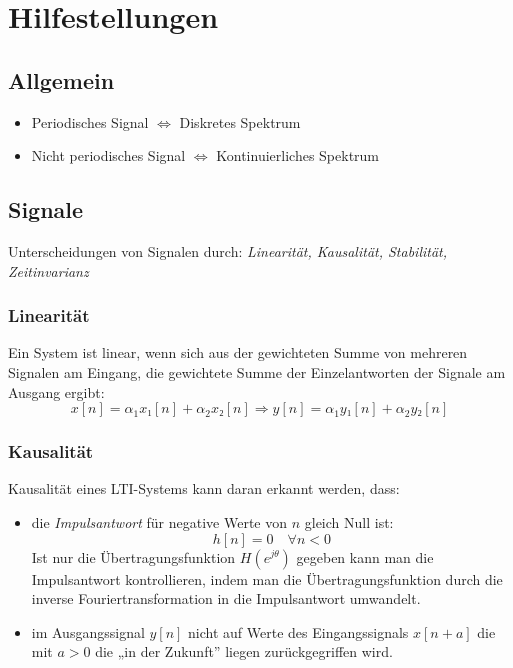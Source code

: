 \documentclass[a4paper, 12pt]{article}
\begin{document}
\section{Hilfestellungen}

\subsection{Allgemein}

\begin{itemize}
    \item Periodisches Signal $⇔$ Diskretes Spektrum
    \item Nicht periodisches Signal $⇔$ Kontinuierliches Spektrum
\end{itemize}

\subsection{Signale}

Unterscheidungen von Signalen durch: \textit{Linearität, Kausalität, Stabilität, Zeitinvarianz}

\subsubsection{Linearität}
Ein System ist linear, wenn sich aus der gewichteten Summe von mehreren Signalen am Eingang, die gewichtete Summe der Einzelantworten der Signale am Ausgang ergibt:
\[
    x[n] = \alpha_1 x₁[n] + \alpha_2 x₂[n] ⇒ y[n] = \alpha_1 y₁[n] + \alpha_2 y₂[n]
\]

\subsubsection{Kausalität}

Kausalität eines LTI-Systems kann daran erkannt werden, dass:
\begin{itemize}
  \item die \emph{Impulsantwort} für negative Werte von $n$ gleich Null ist:
  \[
          h[n]=0 \quad  ∀ n < 0
  \]
  Ist nur die Übertragungsfunktion $H(e^{j\theta})$ gegeben kann man die Impulsantwort kontrollieren, indem man die Übertragungsfunktion durch die inverse Fouriertransformation in die Impulsantwort umwandelt.
  \item im Ausgangssignal $y[n]$ nicht auf Werte des Eingangssignals $x[n+a]$ die mit $a > 0$ die „in der Zukunft” liegen zurückgegriffen wird.
\end{itemize}
\end{document}
